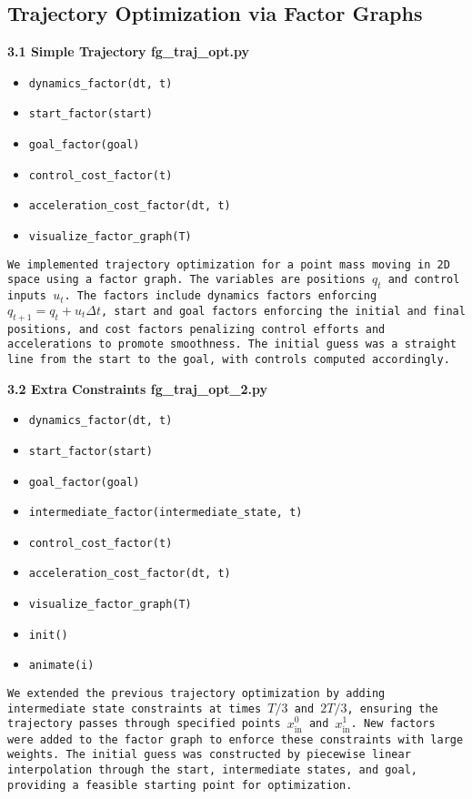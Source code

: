 \documentclass{article}
\begin{document}
\subsection*{Trajectory Optimization via Factor Graphs}
\bfseries{3.1 Simple Trajectory}
\bfseries{\newline fg\_traj\_opt.py}
\begin{itemize}
    \item \texttt{dynamics\_factor(dt, t)}
    \item \texttt{start\_factor(start)}
    \item \texttt{goal\_factor(goal)}
    \item \texttt{control\_cost\_factor(t)}
    \item \texttt{acceleration\_cost\_factor(dt, t)}
    \item \texttt{visualize\_factor\_graph(T)}
\end{itemize}
\texttt{We implemented trajectory optimization for a point mass moving in 2D space using a factor graph. The variables are positions \( q_t \) and control inputs \( u_t \). The factors include dynamics factors enforcing \( q_{t+1} = q_t + u_t \Delta t \), start and goal factors enforcing the initial and final positions, and cost factors penalizing control efforts and accelerations to promote smoothness. The initial guess was a straight line from the start to the goal, with controls computed accordingly. \newline \newline}

\noindent\bfseries{3.2 Extra Constraints}
\bfseries{\newline fg\_traj\_opt\_2.py}
\begin{itemize}
    \item \texttt{dynamics\_factor(dt, t)}
    \item \texttt{start\_factor(start)}
    \item \texttt{goal\_factor(goal)}
    \item \texttt{intermediate\_factor(intermediate\_state, t)}
    \item \texttt{control\_cost\_factor(t)}
    \item \texttt{acceleration\_cost\_factor(dt, t)}
    \item \texttt{visualize\_factor\_graph(T)}
    \item \texttt{init()}
    \item \texttt{animate(i)}
\end{itemize}
\texttt{We extended the previous trajectory optimization by adding intermediate state constraints at times \( T/3 \) and \( 2T/3 \), ensuring the trajectory passes through specified points \( x_{\text{in}}^0 \) and \( x_{\text{in}}^1 \). New factors were added to the factor graph to enforce these constraints with large weights. The initial guess was constructed by piecewise linear interpolation through the start, intermediate states, and goal, providing a feasible starting point for optimization. \newline \newline}
\end{document}
